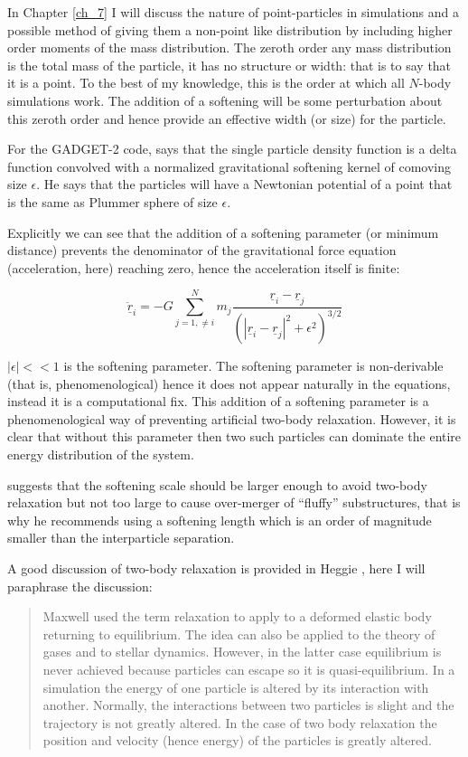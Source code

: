In Chapter \ref{ch_7} I will discuss the nature of point-particles in simulations and a possible method of giving them a non-point like distribution by including higher order moments of the mass distribution. The zeroth order any mass distribution is the total mass of the particle, it has no structure or width: that is to say that it is a point. To the best of my knowledge, this is the order at which all $N$-body simulations work. The addition of a softening will be some perturbation about this zeroth order and hence provide an effective width (or size) for the particle.

For the GADGET-2 code, \citet{bib_spr} says that the single particle density function is a delta function convolved with a normalized gravitational softening kernel of comoving size $\epsilon$. He says that the particles will have a Newtonian potential of a point that is the same as Plummer sphere of size $\epsilon$.

Explicitly we can see that the addition of a softening parameter (or minimum distance) prevents the denominator of the gravitational force equation (acceleration, here) reaching zero, hence the acceleration itself is finite:

\begin{equation}
\ddot{\underline{r}}_i = -G \sum_{j = 1,\ne i}^N m_j \frac{\underline{r}_i -\underline{r}_j}{(|\underline{r}_i - \underline{r}_j|^2 + \epsilon^2)^{3/2}}
\end{equation}

\noindent $|\epsilon| << 1$ is the softening parameter. The softening parameter is non-derivable (that is, phenomenological) hence it does not appear naturally in the equations, instead it is a computational fix. This addition of a softening parameter is a phenomenological way of preventing artificial two-body relaxation. However, it is clear that without this parameter then two such particles can dominate the entire energy distribution of the system.

\citet{bib_hmpc3} suggests that the softening scale should be larger enough to avoid two-body relaxation but not too large to cause over-merger of ``fluffy'' substructures, that is why he recommends using a softening length which is an order of magnitude smaller than the interparticle separation.

A good discussion of two-body relaxation is provided in Heggie \citep{bib_heg}, here I will paraphrase the discussion:

\begin{quote}
Maxwell used the term relaxation to apply to a deformed elastic body returning to equilibrium. The idea can also be applied to the theory of gases and to stellar dynamics. However, in the latter case equilibrium is never achieved because particles can escape so it is quasi-equilibrium. In a simulation the energy of one particle is altered by its interaction with another. Normally, the interactions between two particles is slight and the trajectory is not greatly altered. In the case of two body relaxation the position and velocity (hence energy) of the particles is greatly altered.
\end{quote}

